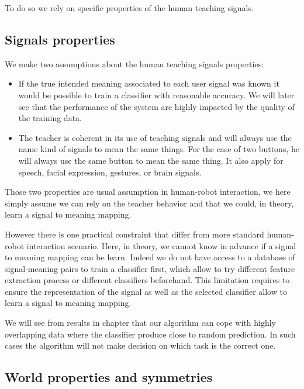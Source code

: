 To do so we rely on specific properties of the human teaching signals.

\subsection{Signals properties}

We make two assumptions about the human teaching signals properties:
\begin{itemize}

\item If the true intended meaning associated to each user signal was known it would be possible to train a classifier with reasonable accuracy. We will later see that the performance of the system are highly impacted by the quality of the training data. 

\item The teacher is coherent in its use of teaching signals and will always use the name kind of signals to mean the same things. For the case of two buttons, he will always use the same button to mean the same thing. It also apply for speech, facial expression, gestures, or brain signals. 

\end{itemize}

Those two properties are usual assumption in human-robot interaction, we here simply assume we can rely on the teacher behavior and that we could, in theory, learn a signal to meaning mapping.

However there is one practical constraint that differ from more standard human-robot interaction scenario. Here, in theory, we cannot know in advance if a signal to meaning mapping can be learn. Indeed we do not have access to a database of signal-meaning pairs to train a classifier first, which allow to try different feature extraction process or different classifiers beforehand. This limitation requires to ensure the representation of the signal as well as the selected classifier allow to learn a signal to meaning mapping. 

We will see from results in chapter  that our algorithm can cope with highly overlapping data where the classifier produce close to random prediction. In such cases the algorithm will not make decision on which task is the correct one.

\subsection{World properties and symmetries}

